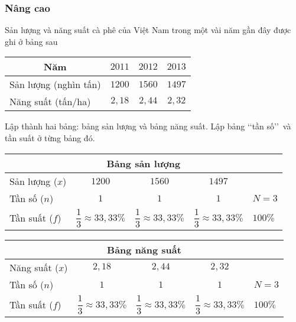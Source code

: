 \subsubsection{Nâng cao}
\begin{bt}%
	Sản lượng và năng suất cà phê của Việt Nam trong một vài năm gần đây được ghi ở bảng sau
	\begin{center}
		\begin{tabular}{|l|c|c|c|}
			\hline
			\multicolumn{1}{|c|}{Năm} &$2011$ &$2012$ &$2013$\\
			\hline
			Sản lượng (nghìn tấn) & $1200$ &$1560$ &$1497$\\
			\hline
			Năng suất (tấn/ha) &$2,18$ &$2,44$ &$2,32$\\
			\hline
		\end{tabular}
	\end{center}
	Lập thành hai bảng: bảng sản lượng và bảng năng suất. Lập bảng \lq\lq tần số\rq\rq\ và tần suất ở từng bảng đó.
	\loigiai
	{
		\begin{center}
			\begin{tabular}{|l|c|c|c|l|}
				\multicolumn{5}{c}{Bảng sản lượng}\\
				\hline
				Sản lượng ($x$) & $1200$ &$1560$ &$1497$ &\\
				\hline
				Tần số ($n$) &$1$ &$1$ &$1$ &$N=3$\\
				\hline
				Tần suất ($f$) &$\dfrac{1}{3}\approx 33,33\%$ &$\dfrac{1}{3}\approx 33,33\%$ &$\dfrac{1}{3}\approx 33,33\%$ &$100\%$\\
				\hline
			\end{tabular}
		\end{center}
		\begin{center}
			\begin{tabular}{|l|c|c|c|l|}
				\multicolumn{5}{c}{Bảng năng suất}\\
				\hline
				Năng suất ($x$) &$2,18$ &$2,44$ &$2,32$ &\\
				\hline
				Tần số ($n$) &$1$ &$1$ &$1$ &$N=3$\\
				\hline
				Tần suất ($f$) &$\dfrac{1}{3}\approx 33,33\%$ &$\dfrac{1}{3}\approx 33,33\%$ &$\dfrac{1}{3}\approx 33,33\%$ &$100\%$\\
				\hline
			\end{tabular}
		\end{center}
	}
\end{bt}
